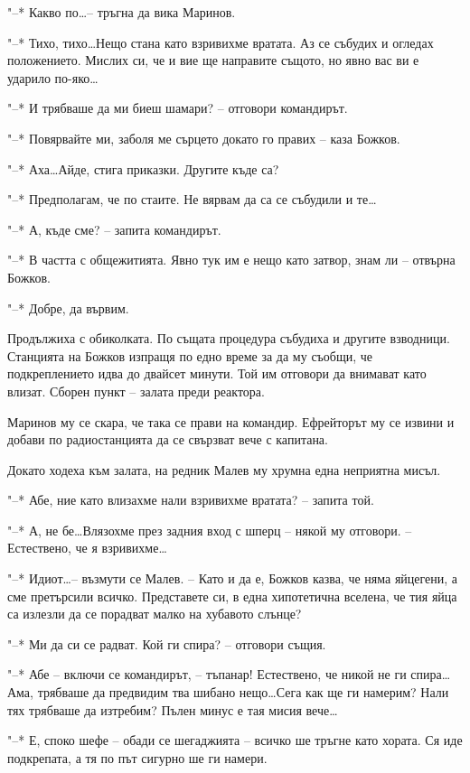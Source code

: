 \documentclass[ebook,openany,12pt]{memoir}
\begin{document}
"--* Какво по\ldots – тръгна да вика Маринов.

"--* Тихо, тихо\ldots Нещо стана като взривихме вратата. Аз се събудих и огледах положението. Мислих си, че и вие ще направите същото, но явно вас ви е ударило по-яко\ldots

"--* И трябваше да ми биеш шамари? -- отговори командирът.

"--* Повярвайте ми, заболя ме сърцето докато го правих -- каза Божков.

"--* Аха\ldots Айде, стига приказки. Другите къде са?

"--* Предполагам, че по стаите. Не вярвам да са се събудили и те\ldots

"--* А, къде сме? -- запита командирът.

"--* В частта с общежитията. Явно тук им е нещо като затвор, знам ли -- отвърна Божков.

"--* Добре, да вървим.

Продължиха с обиколката. По същата процедура събудиха и другите взводници. Станцията на Божков изпращя по едно време за да му съобщи, че подкреплението идва до двайсет минути. Той им отговори да внимават като влизат. Сборен пункт – залата преди реактора.

Маринов му се скара, че така се прави на командир. Ефрейторът му се извини и добави по радиостанцията да се свързват вече с капитана.

Докато ходеха към залата, на редник Малев му хрумна една неприятна мисъл.

"--* Абе, ние като влизахме нали взривихме вратата? – запита той.

"--* А, не бе\ldots Влязохме през задния вход с шперц – някой му отговори. – Естествено, че я взривихме\ldots

"--* Идиот\ldots – възмути се Малев. – Като и да е, Божков казва, че няма яйцегени, а сме претърсили всичко. Представете си, в една хипотетична вселена, че тия яйца са излезли да се порадват малко на хубавото слънце?

"--* Ми да си се радват. Кой ги спира? – отговори същия.

"--* Абе -- включи се командирът, – тъпанар! Естествено, че никой не ги спира\ldots Ама, трябваше да предвидим тва шибано нещо\ldots Сега как ще ги намерим? Нали тях трябваше да изтребим? Пълен минус е тая мисия вече\ldots

"--* Е, споко шефе – обади се шегаджията – всичко ше тръгне като хората. Ся иде подкрепата, а тя по път сигурно ше ги намери.
\end{document}
